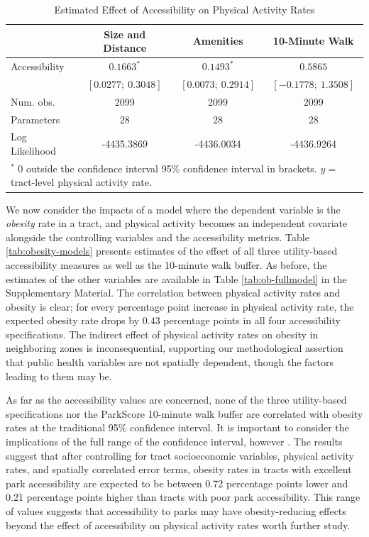 \documentclass[shortAfour,sageh.bst]{sagej}
\begin{document}
\begin{table}
\caption{Estimated Effect of Accessibility on Physical Activity Rates}
\label{tab:pa-models}

\begin{tabular}{l c c c }
\toprule
 & Size and Distance & Amenities & 10-Minute Walk \\
\midrule
Accessibility  & $0.1663^{*}$        & $0.1493^{*}$        & $0.5865$             \\
               & $[0.0277;\ 0.3048]$ & $[0.0073;\ 0.2914]$ & $[-0.1778;\ 1.3508]$ \\
\midrule
Num. obs.      & 2099                & 2099                & 2099                 \\
Parameters     & 28                  & 28                  & 28                   \\
Log Likelihood & -4435.3869          & -4436.0034          & -4436.9264           \\
\bottomrule
\multicolumn{4}{l}{\scriptsize{$^*$ 0 outside the confidence interval 95\% confidence interval in brackets.  $y = $ tract-level physical activity rate.}}
\end{tabular}
\end{table}

We now consider the impacts of a model where the dependent variable is
the \emph{obesity} rate in a tract, and physical activity becomes an
independent covariate alongside the controlling variables and the
accessibility metrics. Table \ref{tab:obesity-models} presents estimates
of the effect of all three utility-based accessibility measures as well
as the 10-minute walk buffer. As before, the estimates of the other
variables are available in Table \ref{tab:ob-fullmodel} in the Supplementary Material. The correlation between
physical activity rates and obesity is clear; for every percentage point
increase in physical activity rate, the expected obesity rate drops by
\(0.43\) percentage points in all four accessibility specifications. The
indirect effect of physical activity rates on obesity in neighboring
zones is inconsequential, supporting our methodological assertion that
public health variables are not spatially dependent, though the factors
leading to them may be.

As far as the accessibility values are concerned, none of the three
utility-based specifications nor the ParkScore 10-minute walk buffer are
correlated with obesity rates at the traditional 95\% confidence
interval. It is important to consider the implications of the full range
of the confidence interval, however \citep{Amrhein2019}. The results
suggest that after controlling for tract socioeconomic variables,
physical activity rates, and spatially correlated error terms, obesity
rates in tracts with excellent park accessibility are expected to be
between 0.72 percentage points lower and 0.21 percentage points higher
than tracts with poor park accessibility. This range of values suggests
that accessibility to parks may have obesity-reducing effects beyond the
effect of accessibility on physical activity rates worth further study.
\end{document}
